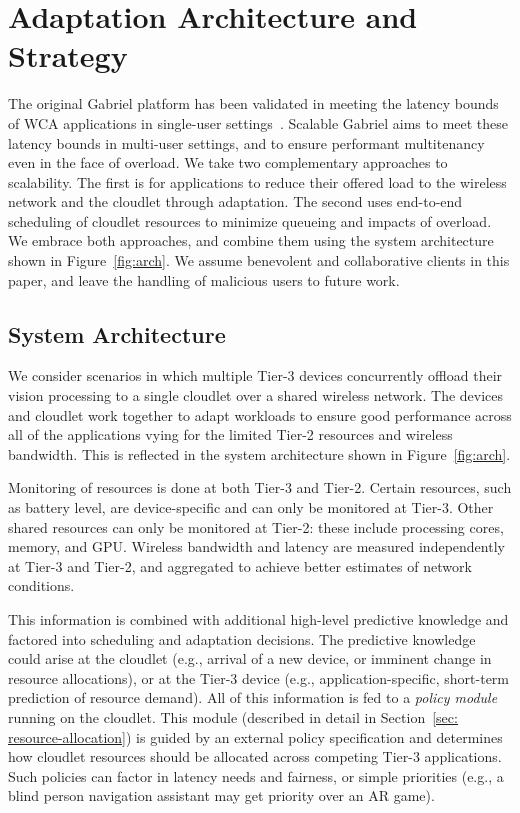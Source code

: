 \section{Adaptation Architecture and Strategy}

The original Gabriel platform has been validated in meeting the
latency bounds of WCA applications in single-user
settings~\cite{Chen2017}.  Scalable Gabriel aims to meet these latency
bounds in multi-user settings, and to ensure performant multitenancy
even in the face of overload.  We take two complementary approaches to
scalability.  The first is for applications to reduce their offered
load to the wireless network and the cloudlet through adaptation.  The
second uses end-to-end scheduling of cloudlet resources to minimize
queueing and impacts of overload.  We embrace both approaches, and
combine them using the system architecture shown in
Figure~\ref{fig:arch}.  We assume benevolent and collaborative clients
in this paper, and leave the handling of malicious users to future work.

\subsection{System Architecture}

We consider scenarios in which multiple Tier-3 devices concurrently
offload their vision processing to a single cloudlet over a shared
wireless network.  The devices and cloudlet work together to adapt
workloads to ensure good performance across all of the applications
vying for the limited Tier-2 resources and wireless bandwidth.  This
is reflected in the system architecture shown in
Figure~\ref{fig:arch}.

Monitoring of resources is done at both Tier-3 and Tier-2.  Certain
resources, such as battery level, are device-specific and can only be
monitored at Tier-3.  Other shared resources can only be monitored at
Tier-2: these include processing cores, memory, and GPU.  Wireless
bandwidth and latency are measured independently at Tier-3 and Tier-2,
and aggregated to achieve better estimates of network conditions.

This information is combined with additional high-level predictive
knowledge and factored into scheduling and adaptation decisions.  The
predictive knowledge could arise at the cloudlet (e.g., arrival of a
new device, or imminent change in resource allocations), or at the
Tier-3 device (e.g., application-specific, short-term prediction of
resource demand).  All of this information is fed to a {\em policy
  module} running on the cloudlet.  This module (described in detail
in Section~\ref{sec: resource-allocation}) is guided by an external
policy specification and determines how cloudlet resources should be
allocated across competing Tier-3 applications.  Such policies can
factor in latency needs and fairness, or simple priorities (e.g., a
blind person navigation assistant may get priority over an AR game).

